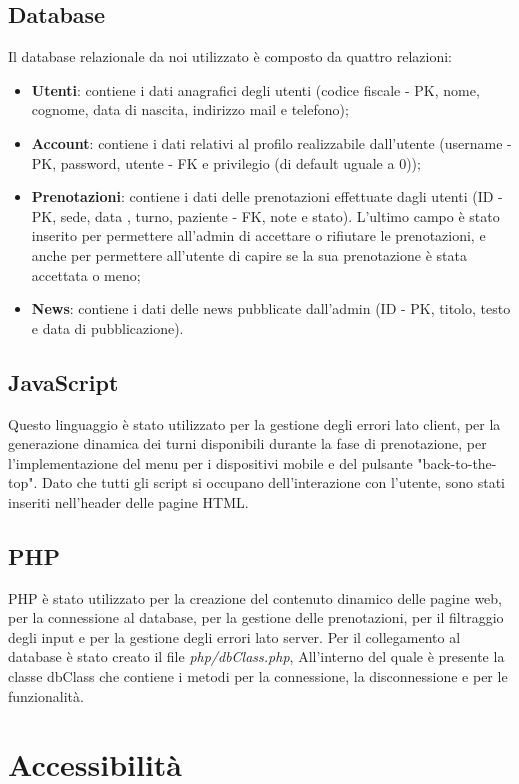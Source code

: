 \documentclass{article}
\begin{document}
\subsection{Database}
Il database relazionale da noi utilizzato è composto da quattro relazioni:
\begin{itemize}
    \item \textbf{Utenti}: contiene i dati anagrafici degli utenti (codice fiscale - PK, nome, cognome, data di nascita, indirizzo mail e telefono);
    \item \textbf{Account}: contiene i dati relativi al profilo realizzabile dall'utente (username - PK, password, utente - FK e privilegio (di default uguale a 0));
    \item \textbf{Prenotazioni}: contiene i dati delle prenotazioni effettuate dagli utenti (ID - PK, sede, data , turno, paziente - FK, note e stato).
    L'ultimo campo è stato inserito per permettere all'admin di accettare o rifiutare le prenotazioni, e anche per permettere all'utente di capire se la sua prenotazione è stata accettata o meno;
    \item \textbf{News}: contiene i dati delle news pubblicate dall'admin (ID - PK, titolo, testo e data di pubblicazione).
\end{itemize}
\subsection{JavaScript}
Questo linguaggio è stato utilizzato per la gestione degli errori lato client, per la generazione dinamica dei turni disponibili durante la fase di prenotazione, per l'implementazione del menu per i dispositivi mobile e del pulsante "back-to-the-top".
Dato che tutti gli script si occupano dell'interazione con l'utente, sono stati inseriti nell'header delle pagine HTML.
\subsection{PHP}
PHP è stato utilizzato per la creazione del contenuto dinamico delle pagine web, per la connessione al database, per la gestione delle prenotazioni, per il filtraggio degli input e per la gestione degli errori lato server. 
Per il collegamento al database è stato creato il file \textit{php/dbClass.php}, All'interno del quale è presente la classe dbClass che contiene i metodi per la connessione, la disconnessione e per le funzionalità.
\section{Accessibilità}
\end{document}
